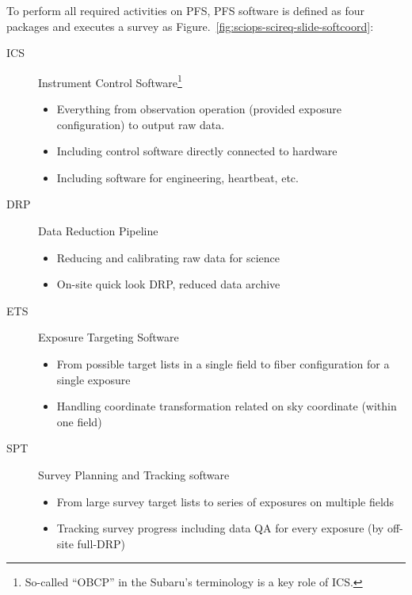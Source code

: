 \documentclass[a4paper,notitlepage]{article}
\begin{document}
To perform all required activities on PFS, PFS software is defined as
four packages and executes a survey as
Figure.~\ref{fig:sciops-scireq-slide-softcoord}:
\begin{description}
 \item[ICS] Instrument Control Software\footnote{So-called ``OBCP'' in
        the Subaru's terminology is a key role of ICS.}
        \begin{itemize}
         \item Everything from observation operation (provided exposure
           configuration) to output raw data.
         \item Including control software directly connected to hardware
         \item Including software for engineering, heartbeat, etc.
        \end{itemize}
 \item[DRP] Data Reduction Pipeline
        \begin{itemize}
         \item Reducing and calibrating raw data for science
         \item On-site quick look DRP, reduced data archive
        \end{itemize}
 \item[ETS] Exposure Targeting Software
        \begin{itemize}
         \item From possible target lists in a single field to fiber
           configuration for a single exposure
         \item Handling coordinate transformation related on sky coordinate
           (within one field)
        \end{itemize}
 \item[SPT] Survey Planning and Tracking software
        \begin{itemize}
         \item From large survey target lists to series of exposures on
           multiple fields
         \item Tracking survey progress including data QA for every
           exposure (by off-site full-DRP)
        \end{itemize}
\end{description}
\end{document}
